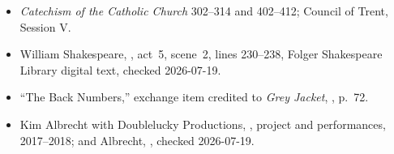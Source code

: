 \begin{itemize}
\item \emph{Catechism of the Catholic Church} 302--314 and 402--412; Council of Trent, Session V.
\item William Shakespeare, , act~5, scene~2, lines 230--238, Folger Shakespeare Library digital text, checked 2026-07-19.
\item “The Back Numbers,” exchange item credited to \emph{Grey Jacket}, , p.~72.
\item Kim Albrecht with Doublelucky Productions, , project and performances, 2017--2018; and Albrecht, , checked 2026-07-19.
\end{itemize}
